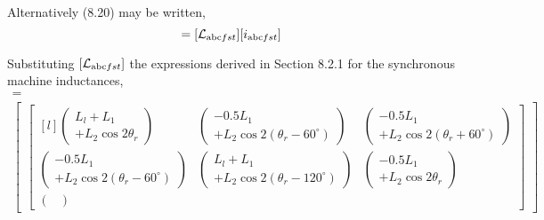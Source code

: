 \documentclass[a4paper,numbers=noenddot,12pt]{scrbook}
\begin{document}
    Alternatively (8.20) may be written,
    \begin{equation}
        [\varPsi_{\textup{abc}fst}] = [\mathcal{L}_{\textup{abc}fst}] [i_{\textup{abc}fst}]
        \label{eq:Eq8.21}
    \end{equation}

    Substituting $[\mathcal{L}_{\textup{abc}fst}]$ the expressions derived in Section 8.2.1 for the synchronous machine inductances,\\ \vfill \pagebreak[4]
    \begin{multline}
        [\mathcal{L}_{\textup{abc}fst}] = \\ 
        \begin{bmatrix}
            \begin{bmatrix*}[l]
                \begin{pmatrix}
                    L_l + L_1 \\ + L_2 \cos 2\theta_r 
                \end{pmatrix}
                & 
                \begin{pmatrix}
                    -0.5 L_1 \\ + L_2 \cos 2(\theta_r - 60^{\circ})
                \end{pmatrix}
                & 
                \begin{pmatrix}
                    -0.5 L_1 \\ + L_2 \cos 2(\theta_r + 60^{\circ})
                \end{pmatrix}
                \\
                \begin{pmatrix}
                    - 0.5 L_1 \\ + L_2 \cos 2(\theta_r -60^{\circ}) 
                \end{pmatrix}
                &
                \begin{pmatrix}
                    L_l + L_1 \\ + L_2 \cos 2(\theta_r - 120^{\circ})
                \end{pmatrix}
                &
                \begin{pmatrix}
                    -0.5 L_1 \\ + L_2 \cos 2\theta_r
                \end{pmatrix}
                \\
                \begin{pmatrix}

\end{pmatrix}
\end{bmatrix*}
\end{bmatrix}
\end{multline}
\end{document}

